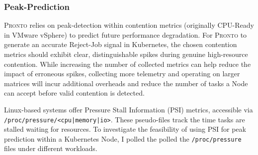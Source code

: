 \subsubsection{Peak-Prediction}
\textsc{Pronto} relies on peak-detection within contention metrics (originally
CPU-Ready in VMware vSphere) to predict future performance degradation. For
\textsc{Pronto} to generate an accurate Reject-Job signal in Kubernetes, the
chosen contention metrics should exhibit clear, distinguishable spikes during
genuine high-resource contention. While increasing the number of collected
metrics can help reduce the impact of erroneous spikes, collecting more
telemetry and operating on larger matrices will incur additional overheads and
reduce the number of tasks a Node can accept before valid contention is
detected.

Linux-based systems offer Pressure Stall Information (PSI) metrics, accessible
via \texttt{/proc/pressure/<cpu|memory|io>}. These pseudo-files track the time
tasks are stalled waiting for resources. To investigate the feasibility of using
PSI for peak prediction within a Kubernetes Node, I polled the polled the
\verb|/proc/pressure| files under different workloads.

